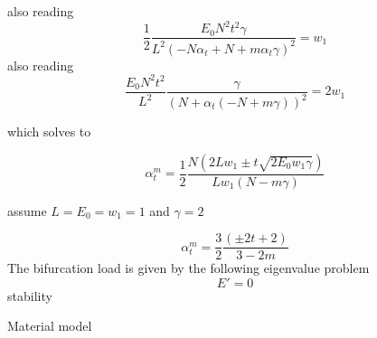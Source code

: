 \documentclass[]{article}
\begin{document}
also reading 
\begin{equation}
    \label{eqn:}
    \frac{1}{2}\frac{E_{0} N^{2} t^{2} \gamma }{L^{2} \left(- N \alpha_{t} + N + m \alpha_{t} \gamma \right)^{2}} =  w_{1}
\end{equation}
also reading 
\begin{equation}
    \label{eqn:}
    \frac{E_{0} N^{2} t^{2}}{L^2}\frac{ \gamma }{\left(N + \alpha_{t} \left(- N + m \gamma\right)\right)^{2}} =  2w_{1}
\end{equation}

which solves to

\begin{equation}
    \label{eqn:bifurcations}
    \alpha_t^m = \frac{1}{2}\frac{N \left(2 L w_{1} \pm  t \sqrt{2E_{0} w_{1} \gamma }\right)}{L w_{1} \left(N - m \gamma \right)}
\end{equation}

assume $L=E_0=w_1=1$ and $\gamma=2$

\begin{equation}
    \label{eqn:bifurcations}
    \alpha_t^m=\frac{3}{2}\frac{ \left(\pm 2t + 2\right)}{3 - 2 m}
\end{equation}
The bifurcation load is given by the following eigenvalue problem 
$$
E' = 0
$$
stability

Material model
\end{document}
